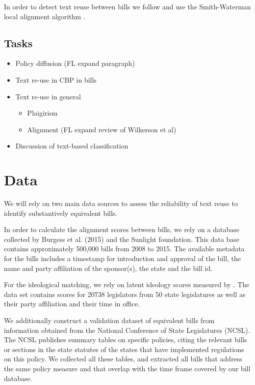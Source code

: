 \documentclass[12pt]{article} %
\begin{document}
In order to detect text reuse between bills we follow \citet{wilkerson2015tracing} and use the Smith-Waterman local alignment algorithm \citep{smith1981identification}. 

\subsection{Tasks}
\begin{itemize}
\item Policy diffusion (FL expand paragraph)
\item Text re-use in CBP in bills 
\item Text re-use in general
\begin{itemize}
\item Plaigirism
\item Alignment (FL expand review of Wilkerson et al)
\end{itemize} 
\item Discussion of text-based classification
\end{itemize}

\section{Data}

We will rely on two main data sources to assess the reliability of text reuse to
identify substantively equivalent bills. 

In order to calculate the alignment scores between bills, we rely on a database collected by Burgess et al. (2015) and the Sunlight foundation. This data base contains approximately 500,000
bills from 2008 to 2015. The available metadata for the bills includes a timestamp for introduction and approval of the bill, the name and party affiliation of the sponsor(s), the state and the bill id. 

For the ideological matching, we rely on latent ideology scores measured by \citep{shor2011}. The data set contains scores for 20738 legislators from 50 state legislatures as well as their party affiliation and their time in office. 

We additionally construct a validation dataset of equivalent bills from information obtained from the National Conference of State Legislatures (NCSL). The NCSL publishes summary tables on specific policies, citing the relevant bills or sections in the state statutes of the states that have implemented regulations on this policy. We collected all these tables, and extracted all bills that address the same policy measure and that overlap with the time frame covered by our bill database.
\end{document}

